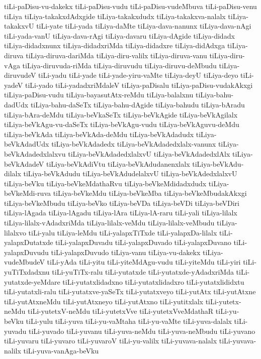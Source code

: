 {tiLi-paDisu-vu-dakekx
tiLi-paDisu-vudu
tiLi-paDisu-vudeMbuva
tiLi-paDisu-venu
tiLiya
tiLiya-takakxdAdxgide
tiLiya-takakxdudx
tiLiya-takakxva-nalalx
tiLiya-takakxvU
tiLi-yate
tiLi-yada
tiLiya-daMte
tiLiya-dava-nanunx
tiLiya-dava-nAgi
tiLi-yada-vanU
tiLiya-dava-rAgi
tiLiya-davaru
tiLiya-dAgide
tiLiya-didadx
tiLiya-didadxnunx
tiLiya-didadxriMda
tiLiya-didadxre
tiLiya-didAdxga
tiLiya-diruva
tiLiya-diruva-dariMda
tiLiya-diru-valilx
tiLiya-diruva-vanu
tiLiya-diru-vAga
tiLiya-diruvuda-riMda
tiLiya-diruvudu
tiLiya-diruvu-deMbudu
tiLiya-diruvudeV
tiLi-yadu
tiLi-yade
tiLi-yade-yiru-vaMte
tiLiya-deyU
tiLiya-deyo
tiLi-yadeV
tiLi-yado
tiLi-yadadxriMdaleV
tiLiya-paDisalu
tiLiya-paDisu-vudakAkxgi
tiLiya-paDisu-vudu
tiLiya-bayasutAtx-reMdu
tiLiya-balalxnu
tiLiya-bahu-dadUdx
tiLiya-bahu-daSeTx
tiLiya-bahu-dAgide
tiLiya-bahudu
tiLiya-bAradu
tiLiya-bAra-deMdu
tiLiya-beVkaSeTx
tiLiya-beVkAgide
tiLiya-beVkAgilalx
tiLiya-beVkAgu-vu-daSeTx
tiLiya-beVkAgu-vudu
tiLiya-beVkAguvu-deMdu
tiLiya-beVkAda
tiLiya-beVkAda-deMdu
tiLiya-beVkAdadudx
tiLiya-beVkAdadUdx
tiLiya-beVkAdadedx
tiLiya-beVkAdadedxlalx-vanunx
tiLiya-beVkAdadedxlalxvu
tiLiya-beVkAdadedxlalxvU
tiLiya-beVkAdadedxlAlx
tiLiya-beVkAdadeV
tiLiya-beVkAdiVtu
tiLiya-beVkAdudanenxlalx
tiLiya-beVkAdu-dilalx
tiLiya-beVkAdudu
tiLiya-beVkAdudelalxvU
tiLiya-beVkAdedxlalxvU
tiLiya-beVku
tiLiya-beVkeMdathaRvu
tiLiya-beVkeMdidadxdudx
tiLiya-beVkeMdi-ruva
tiLiya-beVkeMdu
tiLiya-beVkeMba
tiLiya-beVkeMbudakAkxgi
tiLiya-beVkeMbudu
tiLiya-beVko
tiLiya-beVDa
tiLiya-beVDi
tiLiya-beVDiri
tiLiya-lAgada
tiLiya-lAgadu
tiLiya-lAra
tiLiya-lA-raru
tiLi-yali
tiLiya-lilalx
tiLiya-lilalx-vAdadxriMda
tiLiya-lilalx-veMdu
tiLiya-lilalx-veMbudu
tiLiya-lilalxvo
tiLi-yalu
tiLiya-leMdu
tiLi-yalapxTiTxde
tiLi-yalapxDa-lilalx
tiLi-yalapxDutatxde
tiLi-yalapxDuvadu
tiLi-yalapxDuvado
tiLi-yalapxDuvano
tiLi-yalapxDuvudu
tiLi-yalapxDuvudo
tiLiya-vanu
tiLiya-vu-dakekx
tiLiya-vudeMbudeV
tiLi-yAda
tiLi-yitu
tiLi-yiteMdAgu-vudu
tiLi-yiteMdu
tiLi-yiri
tiLi-yuTiTxdadxnu
tiLi-yuTiTx-ralu
tiLi-yutatxde
tiLi-yutatxde-yAdadxriMda
tiLi-yutatxde-yeMdare
tiLi-yutatxlidadxno
tiLi-yutatxlidadxro
tiLi-yutatxlididxtu
tiLi-yutatxli-ralu
tiLi-yutatxve-yaSeTx
tiLi-yutatxveyo
tiLi-yutAtx
tiLi-yutAtxne
tiLi-yutAtxneMdu
tiLi-yutAtxneyo
tiLi-yutAtxno
tiLi-yutitxlalx
tiLi-yutetx-neMdu
tiLi-yutetxV-neMdu
tiLi-yutetxVve
tiLi-yutetxVveMdathaR
tiLi-yu-beVku
tiLi-yulu
tiLi-yuva
tiLi-yu-vaMtaha
tiLi-yu-vaMte
tiLi-yuva-dalalx
tiLi-yuvadu
tiLi-yuvado
tiLi-yuvanu
tiLi-yuva-neMdu
tiLi-yuva-neMbudu
tiLi-yuvano
tiLi-yuvaru
tiLi-yuvaro
tiLi-yuvaroV
tiLi-yu-valilx
tiLi-yuvava-nalalx
tiLi-yuvava-nalilx
tiLi-yuva-vanAga-beVku
}
